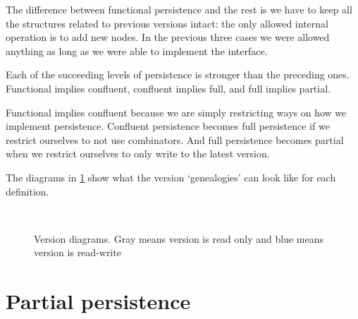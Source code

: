 \documentclass[11pt]{article}
\begin{document}
The difference between functional persistence and the rest is we have to keep all the structures related to previous versions intact: the only allowed internal operation is to add new nodes. In the previous three cases we were allowed anything as long as we were able to implement the interface.

Each of the succeeding levels of persistence is stronger than the preceding ones. Functional implies confluent, confluent  implies full, and  full implies partial. 

Functional implies confluent because we are simply restricting ways on how we implement persistence. Confluent persistence becomes full persistence if we restrict ourselves to not use combinators. And full persistence becomes partial when we restrict ourselves to only write to the latest version.  

The diagrams in \ref{fig:version-diagrams} show what the version `genealogies' can look like for each definition.

\begin{figure}[h]
  \centering
\mbox{
} \\
 
 \caption{Version diagrams. Gray means version is read only and blue means version is read-write}
  \label{fig:version-diagrams}
\end{figure}

\section{Partial persistence}
\end{document}
